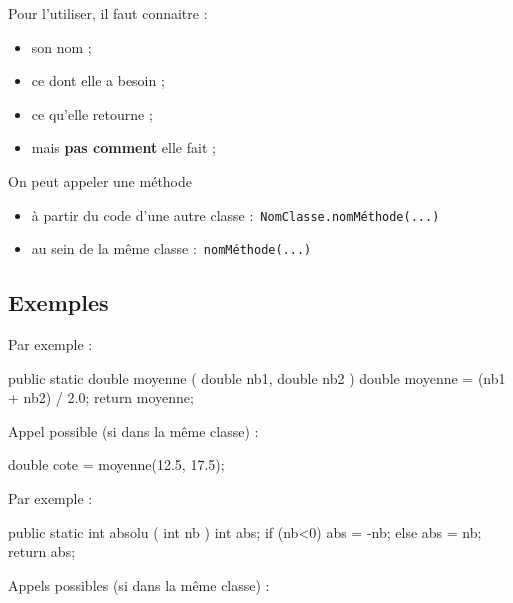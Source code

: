 \documentclass[11pt,a4paper]{article}
\begin{document}
            \par
         
		    Pour l'utiliser, il faut connaitre : 
		    
					\begin{itemize}
				
			\item son nom ;
			\item ce dont elle a besoin ;
			\item ce qu'elle retourne ;
			\item mais \textbf{pas comment} elle fait ;
					\end{itemize}
				
            \par
         
		    On peut appeler une m\'ethode 
		    
					\begin{itemize}
				
			\item \`a partir du code d'une autre classe : \,\verb|NomClasse.nomMéthode(...)|\,
			\item au sein de la m\^eme classe : \,\verb|nomMéthode(...)|\,
					\end{itemize}
				
            \par
        \subsection{Exemples}Par exemple : 
            \par
        \begin{Java}

public static double moyenne ( double nb1, double nb2 ) {
    double moyenne = (nb1 + nb2) / 2.0;
    return moyenne;
}				\end{Java}
        Appel possible (si dans la m\^eme classe) :
      
            \par
        \begin{Java}

double cote = moyenne(12.5, 17.5);
				\end{Java}Par exemple : 
            \par
        \begin{Java}

public static int absolu ( int nb ) {
    int abs;
    if (nb<0) {
      abs = -nb;
    } else {
      abs = nb;
    }
    return abs;
}				\end{Java}
        Appels possibles (si dans la m\^eme classe) :
      
\end{document}
